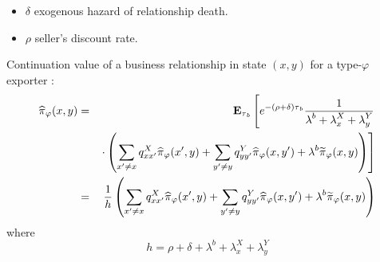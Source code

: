 \documentclass[notes=show]{beamer}
\begin{document}
\begin{frame}%



\begin{itemize}
\item $\delta $ exogenous hazard of relationship death.

\item $\rho $ seller's discount rate.
\end{itemize}

Continuation value of a business relationship in state $(x,y)$ for a type-$%
\varphi $ exporter :%
\begin{eqnarray*}
\widehat{\pi }_{\varphi }(x,y) &=&\mathbf{E}_{\tau _{b}}\left[ e^{-(\rho
+\delta )\tau _{b}}\frac{1}{\lambda ^{b}+\lambda _{x}^{X}+\lambda _{y}^{Y}}%
\right. \\
&&\left. \cdot \left( \sum_{x^{\prime }\neq x}q_{xx^{\prime }}^{X}\widehat{%
\pi }_{\varphi }(x^{\prime },y)+\sum_{y^{\prime }\neq y}q_{yy^{\prime }}^{Y}%
\widehat{\pi }_{\varphi }(x,y^{\prime })+\lambda ^{b}\widetilde{\pi }%
_{\varphi }(x,y)\right) \right] \\
&=&\frac{1}{h}\left( \sum_{x^{\prime }\neq x}q_{xx^{\prime }}^{X}\widehat{%
\pi }_{\varphi }(x^{\prime },y)+\sum_{y^{\prime }\neq y}q_{yy^{\prime }}^{Y}%
\widehat{\pi }_{\varphi }(x,y^{\prime })+\lambda ^{b}\widetilde{\pi }%
_{\varphi }(x,y)\right)
\end{eqnarray*}%
where%
\[
h=\rho +\delta +\lambda ^{b}+\lambda _{x}^{X}+\lambda _{y}^{Y} 
\]

\end{frame}%
\end{document}
